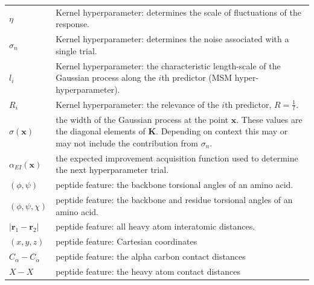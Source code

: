 \begin{table}
\begin{tabularx}{0.9\textwidth}{ l >{\raggedright\arraybackslash}X  }
        $\eta$ & Kernel hyperparameter: determines the scale of fluctuations of the response. \\
        $\sigma_{n}$ & Kernel hyperparameter: determines the noise associated with a single trial. \\
        $l_{i}$ & Kernel hyperparameter: the characteristic length-scale of the Gaussian process 
                along the $i$th predictor (MSM hyper-hyperparameter).\\
        $R_{i}$ & Kernel hyperparameter: the relevance of the $i$th predictor, $R=\frac{1}{l}$. \\ 
        $\sigma(\mathbf{x})$ & the width of the Gaussian process at the point $\mathbf{x}$. These values  are the diagonal elements of $\mathbf{K}$. Depending on context this may or may not include the contribution from $\sigma_{n}$. \\
        $\alpha_{EI}(\mathbf{x})$ & the expected improvement acquisition function used to determine the next hyperparameter trial. \\
        $(\phi, \psi)$ & peptide feature: the backbone torsional angles of an amino acid.  \\
        $(\phi, \psi, \chi)$ & peptide feature: the backbone and residue torsional angles of an amino acid. \\
        $|\mathbf{r}_{1}-\mathbf{r}_{2}|$ & peptide feature: all heavy atom interatomic distances.  \\
        $(x, y, z)$ & peptide feature: Cartesian coordinates \\
        $C_{\alpha}-C_{\alpha}$ & peptide feature: the alpha carbon contact distances \\
        $X-X$ & peptide feature: the heavy atom contact distances \\
     \hline
     \end{tabularx}
    \label{tab:msm_symbols}
\end{table}

